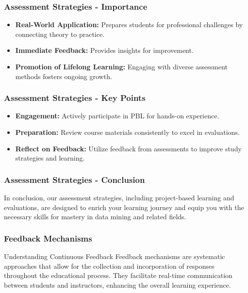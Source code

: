 \documentclass[aspectratio=169]{beamer}
\begin{document}
\begin{frame}[fragile]
    \frametitle{Assessment Strategies - Importance}
    \begin{itemize}
        \item \textbf{Real-World Application:} Prepares students for professional challenges by connecting theory to practice.
        \item \textbf{Immediate Feedback:} Provides insights for improvement.
        \item \textbf{Promotion of Lifelong Learning:} Engaging with diverse assessment methods fosters ongoing growth.
    \end{itemize}
\end{frame}

\begin{frame}[fragile]
    \frametitle{Assessment Strategies - Key Points}
    \begin{itemize}
        \item \textbf{Engagement:} Actively participate in PBL for hands-on experience.
        \item \textbf{Preparation:} Review course materials consistently to excel in evaluations.
        \item \textbf{Reflect on Feedback:} Utilize feedback from assessments to improve study strategies and learning.
    \end{itemize}
\end{frame}

\begin{frame}[fragile]
    \frametitle{Assessment Strategies - Conclusion}
    In conclusion, our assessment strategies, including project-based learning and evaluations, are designed to enrich your learning journey and equip you with the necessary skills for mastery in data mining and related fields.
\end{frame}

\begin{frame}[fragile]
    \frametitle{Feedback Mechanisms}
    \begin{block}{Understanding Continuous Feedback}
        Feedback mechanisms are systematic approaches that allow for the collection and incorporation of responses throughout the educational process. They facilitate real-time communication between students and instructors, enhancing the overall learning experience.
    \end{block}
\end{frame}
\end{document}
